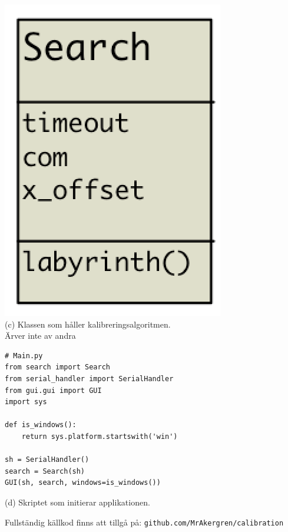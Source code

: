 \begin{minipage}[l]{0.49\textwidth}
    \vspace*{2em}
    \centering
        \includegraphics[scale=0.25]{res/img/search_uml} \\
        \vspace*{3.7em}
        (c) Klassen som håller kalibreringsalgoritmen. \\ Ärver inte av andra
\end{minipage}
\begin{minipage}[l]{0.49\textwidth}
    \vspace{-3.5em}
        \begin{verbatim}
# Main.py
from search import Search
from serial_handler import SerialHandler
from gui.gui import GUI
import sys

def is_windows():
    return sys.platform.startswith('win')

sh = SerialHandler()
search = Search(sh)
GUI(sh, search, windows=is_windows())
\end{verbatim}
        \centering
        (d) Skriptet som initierar applikationen.
\end{minipage}

\vfill
\begin{center}
Fullständig källkod finns att tillgå på: \texttt{github.com/MrAkergren/calibration}
\end{center}

